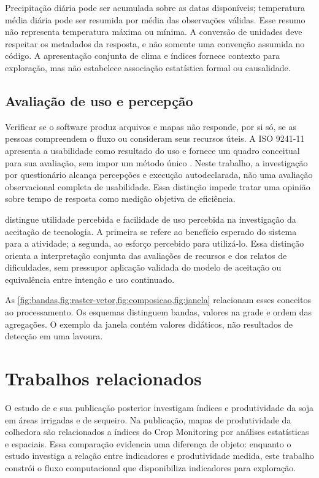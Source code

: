 Precipitação diária pode ser acumulada sobre as datas disponíveis; temperatura média diária pode ser resumida por média das observações válidas. Esse resumo não representa temperatura máxima ou mínima. A conversão de unidades deve respeitar os metadados da resposta, e não somente uma convenção assumida no código. A apresentação conjunta de clima e índices fornece contexto para exploração, mas não estabelece associação estatística formal ou causalidade.

\subsection{Avaliação de uso e percepção}

Verificar se o software produz arquivos e mapas não responde, por si só, se as pessoas compreendem o fluxo ou consideram seus recursos úteis. A ISO 9241-11 apresenta a usabilidade como resultado do uso e fornece um quadro conceitual para sua avaliação, sem impor um método único \citep{ISO9241_2018}. Neste trabalho, a investigação por questionário alcança percepções e execução autodeclarada, não uma avaliação observacional completa de usabilidade. Essa distinção impede tratar uma opinião sobre tempo de resposta como medição objetiva de eficiência.

\citet{DAVIS1989} distingue utilidade percebida e facilidade de uso percebida na investigação da aceitação de tecnologia. A primeira se refere ao benefício esperado do sistema para a atividade; a segunda, ao esforço percebido para utilizá-lo. Essa distinção orienta a interpretação conjunta das avaliações de recursos e dos relatos de dificuldades, sem pressupor aplicação validada do modelo de aceitação ou equivalência entre intenção e uso continuado.

As \cref{fig:bandas,fig:raster-vetor,fig:composicao,fig:janela} relacionam esses conceitos ao processamento. Os esquemas distinguem bandas, valores na grade e ordem das agregações. O exemplo da janela contém valores didáticos, não resultados de detecção em uma lavoura.


\section{Trabalhos relacionados}\label{sec:relacionados-final}

O estudo de \citet{SLAIFFER2023} e sua publicação posterior \citep{SLAIFFER2025} investigam índices e produtividade da soja em áreas irrigadas e de sequeiro. Na publicação, mapas de produtividade da colhedora são relacionados a índices do Crop Monitoring por análises estatísticas e espaciais. Essa comparação evidencia uma diferença de objeto: enquanto o estudo investiga a relação entre indicadores e produtividade medida, este trabalho constrói o fluxo computacional que disponibiliza indicadores para exploração.

